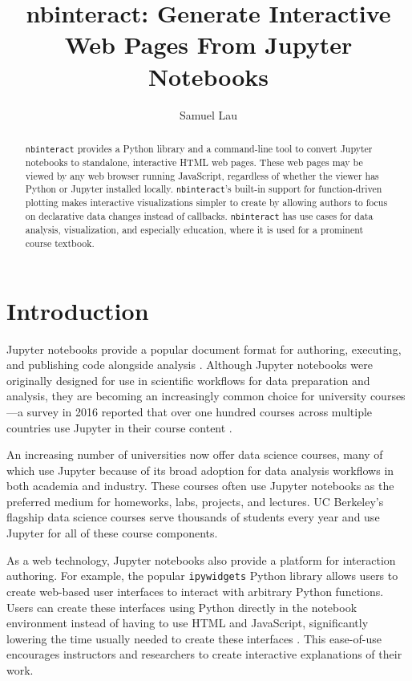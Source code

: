 \documentclass[nobib]{tufte-handout}
\title{nbinteract: Generate Interactive Web Pages From Jupyter Notebooks}
\author[Samuel Lau]{Samuel Lau}
\newcommand{\code}[1]{\texttt{#1}}
\begin{document}
\maketitle%

\begin{abstract}
\noindent
\code{nbinteract} provides a Python library and a command-line tool to convert
Jupyter notebooks to standalone, interactive HTML web pages. These web pages
may be viewed by any web browser running JavaScript, regardless of whether the
viewer has Python or Jupyter installed locally. \code{nbinteract}'s built-in
support for function-driven plotting makes interactive visualizations simpler
to create by allowing authors to focus on declarative data changes instead of
callbacks. \code{nbinteract} has use cases for data analysis, visualization,
and especially education, where it is used for a prominent course textbook.
\end{abstract}

\section{Introduction} %
\label{sec:introduction}

Jupyter notebooks provide a popular document format for authoring, executing,
and publishing code alongside analysis \cite{thomas_jupyter_2016}. Although
Jupyter notebooks were originally designed for use in scientific workflows for
data preparation and analysis, they are becoming an increasingly common choice
for university courses---a survey in 2016 reported that over one hundred
courses across multiple countries use Jupyter in their course content
\cite{hamrick_2016_2016}.

An increasing number of universities now offer data science courses, many of
which use Jupyter because of its broad adoption for data analysis workflows in
both academia and industry. These courses often use Jupyter notebooks as the
preferred medium for homeworks, labs, projects, and lectures. UC Berkeley's
flagship data science courses serve thousands of students every year and use
Jupyter for all of these course components.

As a web technology, Jupyter notebooks also provide a platform for interaction
authoring. For example, the popular \code{ipywidgets} Python library allows
users to create web-based user interfaces to interact with arbitrary Python
functions. Users can create these interfaces using Python directly in the
notebook environment instead of having to use HTML and JavaScript,
significantly lowering the time usually needed to create these interfaces
\cite{_jupyter-widgets/ipywidgets_}. This ease-of-use encourages instructors
and researchers to create interactive explanations of their work.
\end{document}

